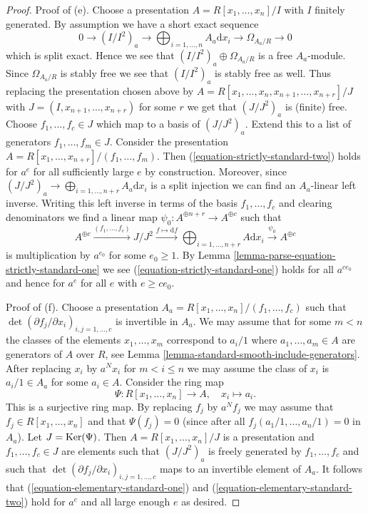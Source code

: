 \begin{proof}
\medskip\noindent
Proof of (e). Choose a presentation
$A = R[x_1, \ldots, x_n]/I$ with $I$ finitely generated.
By assumption we have a short exact sequence
$$
0 \to (I/I^2)_a \to \bigoplus\nolimits_{i = 1, \ldots, n} A_a\text{d}x_i \to
\Omega_{A_a/R} \to 0
$$
which is split exact. Hence we see that
$(I/I^2)_a \oplus \Omega_{A_a/R}$ is a free $A_a$-module.
Since $\Omega_{A_a/R}$ is stably free we see that $(I/I^2)_a$
is stably free as well. Thus replacing the presentation chosen
above by $A = R[x_1, \ldots, x_n, x_{n + 1}, \ldots, x_{n + r}]/J$ with
$J = (I, x_{n + 1}, \ldots, x_{n + r})$ for some $r$ we get that $(J/J^2)_a$
is (finite) free. Choose $f_1, \ldots, f_c \in J$ which map to a basis of
$(J/J^2)_a$. Extend this to a list of generators
$f_1, \ldots, f_m \in J$. Consider the presentation
$A = R[x_1, \ldots, x_{n + r}]/(f_1, \ldots, f_m)$.
Then (\ref{equation-strictly-standard-two}) holds for $a^e$
for all sufficiently large $e$ by construction. Moreover, since
$(J/J^2)_a \to \bigoplus\nolimits_{i = 1, \ldots, n + r} A_a\text{d}x_i$
is a split injection we can find an $A_a$-linear left inverse.
Writing this left inverse in terms of the basis $f_1, \ldots, f_c$
and clearing denominators we find a linear map
$\psi_0 : A^{\oplus n + r} \to A^{\oplus c}$ such that
$$
A^{\oplus c} \xrightarrow{(f_1, \ldots, f_c)}
J/J^2 \xrightarrow{f \mapsto \text{d}f}
\bigoplus\nolimits_{i = 1, \ldots, n + r} A \text{d}x_i
\xrightarrow{\psi_0}
A^{\oplus c}
$$
is multiplication by $a^{e_0}$ for some $e_0 \geq 1$. By
Lemma \ref{lemma-parse-equation-strictly-standard-one}
we see (\ref{equation-strictly-standard-one})
holds for all $a^{ce_0}$ and hence for $a^e$ for all $e$ with $e \geq ce_0$.

\medskip\noindent
Proof of (f). Choose a presentation
$A_a = R[x_1, \ldots, x_n]/(f_1, \ldots, f_c)$ such that
$\det(\partial f_j/\partial x_i)_{i, j = 1, \ldots, c}$
is invertible in $A_a$. We may assume that for some
$m < n$ the classes of the elements $x_1, \ldots, x_m$
correspond to $a_i/1$ where $a_1, \ldots, a_m \in A$ are generators of $A$
over $R$, see Lemma \ref{lemma-standard-smooth-include-generators}.
After replacing $x_i$ by $a^Nx_i$ for $m < i \leq n$
we may assume the class of $x_i$ is $a_i/1 \in A_a$ for some
$a_i \in A$. Consider the ring map
$$
\Psi : R[x_1, \ldots, x_n] \longrightarrow A,\quad
x_i \longmapsto a_i.
$$
This is a surjective ring map. By replacing $f_j$ by $a^Nf_j$ we may
assume that $f_j \in R[x_1, \ldots, x_n]$ and that
$\Psi(f_j) = 0$ (since after all $f_j(a_1/1, \ldots, a_n/1) = 0$
in $A_a$). Let $J = \mathop{\mathrm{Ker}}(\Psi)$. Then $A = R[x_1, \ldots, x_n]/J$
is a presentation and $f_1, \ldots, f_c \in J$ are elements such that
$(J/J^2)_a$ is freely generated by $f_1, \ldots, f_c$ and such
that $\det(\partial f_j/\partial x_i)_{i, j = 1, \ldots, c}$
maps to an invertible element of $A_a$. It follows that
(\ref{equation-elementary-standard-one}) and
(\ref{equation-elementary-standard-two})
hold for $a^e$ and all large enough $e$ as desired.
\end{proof}






